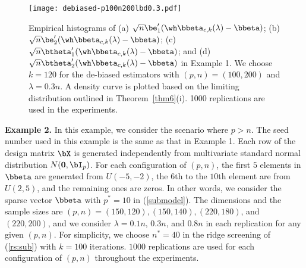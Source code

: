\begin{figure}[ht]
\begin{center}
{\texttt{[image: debiased-p100n200lbd0.3.pdf]}}
\caption{Empirical histograms of (a) $\sqrt{n}\be_1'(\wh\bbeta_{c,k}(\lambda)-\bbeta)$; (b)  $\sqrt{n}\be_2'(\wh\bbeta_{c,k}(\lambda)-\bbeta)$; (c) $\sqrt{n}\btheta_1'(\wh\bbeta_{c,k}(\lambda)-\bbeta)$; and (d) $\sqrt{n}\btheta_2'(\wh\bbeta_{c,k}(\lambda)-\bbeta)$ in Example 1. We choose 
$k=120$ for the de-biased estimators with $(p,n)=(100,200)$ and $\lambda=0.3n$. A density curve is plotted based on the limiting distribution outlined in Theorem~\ref{thm6}(i).  1000 replications are used in the experiments. }\label{fig-2}
\end{center}
\end{figure}


{\noindent\bf Example 2.} In this example, we consider the scenario where $p>n$. The seed number used in this example is the same as that in Example 1. Each row of the design matrix $\bX$ is generated independently from multivariate standard normal distribution $N({\bf 0},\bI_p)$. For each configuration of $(p,n)$, the first $5$ elements in $\bbeta$ are generated from $U(-5,-2)$,  the $6$th to the $10$th element are from $U(2,5)$, and the remaining ones are zeros. In other words, we consider the sparse vector $\bbeta$ with $p^*=10$ in (\ref{submodel}). The dimensions and the sample sizes are $(p,n)=(150,120), (150,140), (220,180)$, and $(220,200)$, and we consider $\lambda=0.1n$, $0.3n$, and $0.8n$ in each replication for any given $(p,n)$. For simplicity, we choose $n^*=40$ in the ridge screening of (\ref{rs:sub}) with $k=100$ iterations. $1000$ replications are used for each configuration of $(p,n)$ throughout the experiments.



